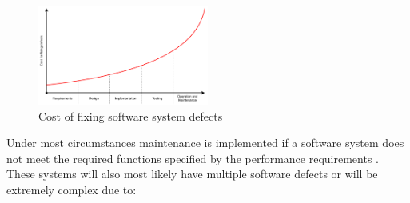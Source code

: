 \begin{figure}[h!] %
	\centering %
	\includegraphics[width=0.5\textwidth]{Images/Chapter1/Background/Cost_of_fixing_bugs/Cost_of_fixing_bugs.pdf}
	\caption{Cost of fixing software system defects \cite{Ogheneovo2014}}\label{fig:CH1_Costs_of_fixing_bugs}
\end{figure} 

Under most circumstances maintenance is implemented if a software system does not meet the required functions specified by the performance requirements \cite{Ogheneovo2014, Sneed2004}. These systems will also most likely have multiple software defects or will be extremely complex due to:

